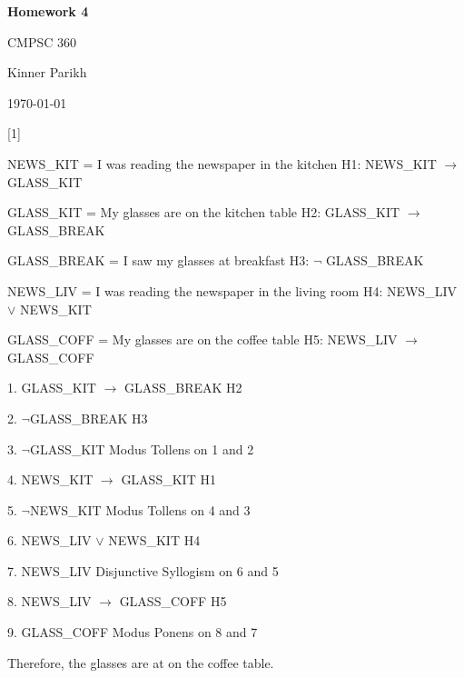 \documentclass{article} %
\newcommand{\question}[2][]{\begin{flushleft}
        \textbf{Question #1}: \textit{#2}

\end{flushleft}}
\newcommand{\maketitletwo}[2][]{\begin{center}
        \Large{\textbf{Homework #1}
            
            CMPSC 360} %
        \vspace{5pt}
        
        \normalsize{Kinner Parikh  %
        
        \today}        %
        \vspace{15pt}
        
\end{center}}
\begin{document}
    \maketitletwo[4]  %
    

                                                                 

    \question[1]{}
    
    NEWS\_KIT = I was reading the newspaper in the kitchen \tabto*{11cm} H1: NEWS\_KIT $\rightarrow$ GLASS\_KIT
    
    GLASS\_KIT = My glasses are on the kitchen table \tabto*{11cm} H2: GLASS\_KIT $\rightarrow$ GLASS\_BREAK
    
    GLASS\_BREAK = I saw my glasses at breakfast \tabto*{11cm} H3: $\neg$ GLASS\_BREAK

    NEWS\_LIV = I was reading the newspaper in the living room \tabto*{11cm} H4: NEWS\_LIV $\lor$ NEWS\_KIT
    
    GLASS\_COFF = My glasses are on the coffee table \tabto*{11cm} H5: NEWS\_LIV $\rightarrow$ GLASS\_COFF
    
    \hspace*{0cm}

    1. GLASS\_KIT $\rightarrow$ GLASS\_BREAK \tabto*{7cm}H2

    2. $\neg$GLASS\_BREAK \tabto*{7cm}H3

    3. $\neg$GLASS\_KIT \tabto*{7cm}Modus Tollens on 1 and 2

    4. NEWS\_KIT $\rightarrow$ GLASS\_KIT \tabto*{7cm}H1

    5. $\neg$NEWS\_KIT \tabto*{7cm}Modus Tollens on 4 and 3

    6. NEWS\_LIV $\lor$ NEWS\_KIT \tabto*{7cm}H4

    7. NEWS\_LIV \tabto*{7cm}Disjunctive Syllogism on 6 and 5

    8. NEWS\_LIV $\rightarrow$ GLASS\_COFF \tabto*{7cm}H5

    9. GLASS\_COFF \tabto*{7cm}Modus Ponens on 8 and 7


    \hspace*{0cm}

    Therefore, the glasses are at on the coffee table.
\end{document}
